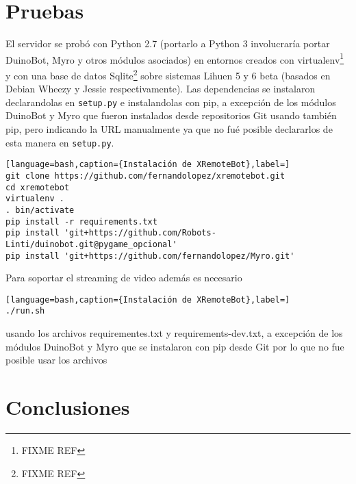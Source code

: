 \chapter{Pruebas}\label{cha:pruebas}

El servidor se probó con Python 2.7 (portarlo a Python 3 involucraría
portar DuinoBot, Myro y otros módulos asociados) en entornos creados
con virtualenv\footnote{FIXME REF} y con una base de datos
Sqlite\footnote{FIXME REF}
sobre
sistemas Lihuen 5 y 6 beta (basados en Debian Wheezy y Jessie respectivamente).
Las dependencias se instalaron declarandolas en \texttt{setup.py} e instalandolas
con pip, a excepción de los módulos DuinoBot y Myro que fueron instalados
desde repositorios Git usando también pip, pero indicando la URL manualmente
ya que no fué posible declararlos de esta manera en \texttt{setup.py}.

\begin{lstlisting}[language=bash,caption={Instalación de XRemoteBot},label=]
git clone https://github.com/fernandolopez/xremotebot.git
cd xremotebot
virtualenv .
. bin/activate
pip install -r requirements.txt
pip install 'git+https://github.com/Robots-Linti/duinobot.git@pygame_opcional'
pip install 'git+https://github.com/fernandolopez/Myro.git'
\end{lstlisting}

Para soportar el streaming de video además es necesario 



\begin{lstlisting}[language=bash,caption={Instalación de XRemoteBot},label=]
./run.sh
\end{lstlisting}

usando los archivos requirementes.txt
y requirements-dev.txt, a excepción de los módulos DuinoBot y Myro que se
instalaron con pip desde Git por lo que no fue posible usar los archivos



\chapter{Conclusiones}\label{cha:conclusiones}

%


